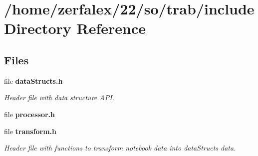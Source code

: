 \section{/home/zerfalex/22/so/trab/include Directory Reference}
\label{dir_d44c64559bbebec7f509842c48db8b23}
\subsection*{Files}
\begin{DoxyCompactItemize}
\item 
file {\bf data\+Structs.\+h}
\begin{DoxyCompactList}\small\item\em Header file with data structure A\+PI. \end{DoxyCompactList}\item 
file {\bf processor.\+h}
\item 
file {\bf transform.\+h}
\begin{DoxyCompactList}\small\item\em Header file with functions to transform notebook data into data\+Structs data. \end{DoxyCompactList}\end{DoxyCompactItemize}
